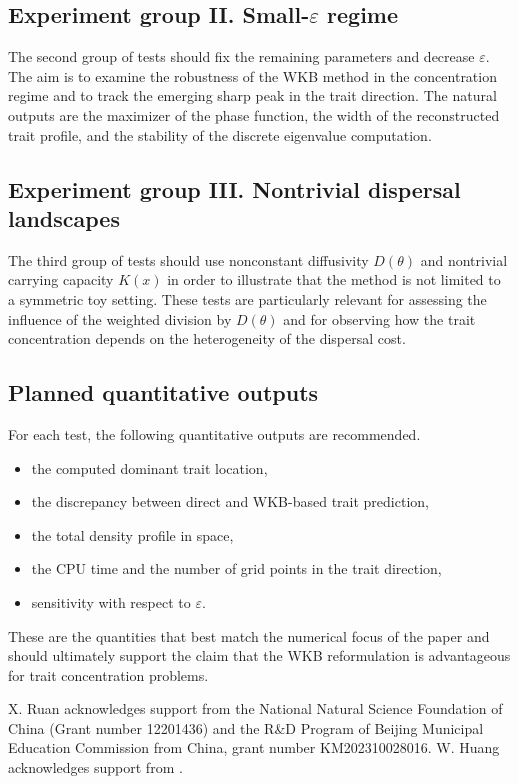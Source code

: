 \documentclass[11pt, dina4, amsfont12]{article}
\begin{document}
\subsection{Experiment group II. Small-$\varepsilon$ regime}

The second group of tests should fix the remaining parameters and decrease $\varepsilon$. The aim is to examine the robustness of the WKB method in the concentration regime and to track the emerging sharp peak in the trait direction. The natural outputs are the maximizer of the phase function, the width of the reconstructed trait profile, and the stability of the discrete eigenvalue computation.

\subsection{Experiment group III. Nontrivial dispersal landscapes}

The third group of tests should use nonconstant diffusivity $D(\theta)$ and nontrivial carrying capacity $K(x)$ in order to illustrate that the method is not limited to a symmetric toy setting. These tests are particularly relevant for assessing the influence of the weighted division by $D(\theta)$ and for observing how the trait concentration depends on the heterogeneity of the dispersal cost.

\subsection{Planned quantitative outputs}

For each test, the following quantitative outputs are recommended.
\begin{itemize}
\item the computed dominant trait location,
\item the discrepancy between direct and WKB-based trait prediction,
\item the total density profile in space,
\item the CPU time and the number of grid points in the trait direction,
\item sensitivity with respect to $\varepsilon$.
\end{itemize}
These are the quantities that best match the numerical focus of the paper and should ultimately support the claim that the WKB reformulation is advantageous for trait concentration problems.

\bigskip
{}
X. Ruan acknowledges support from the National Natural Science Foundation of China (Grant number 12201436) and the R\&D Program of Beijing Municipal Education Commission from China, grant number KM202310028016.
W. Huang acknowledges support from .
\end{document}
